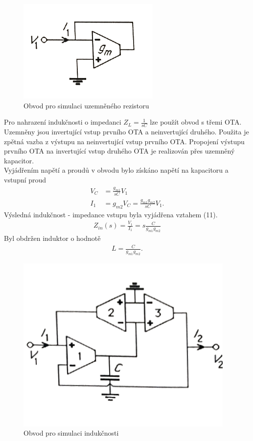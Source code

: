 \documentclass[twoside]{article}
\begin{document}
\begin{figure}[H]
\centering
\includegraphics[scale=0.7]{image10.png}
\caption{Obvod pro simulaci uzemněného rezistoru \cite{8}}
\end{figure}
\noindent Pro nahrazení indukčnosti o impedanci $Z_L = \frac{1}{sC}$ lze použít obvod s třemi OTA. Uzemněny jsou invertující vstup prvního OTA a neinvertující druhého. Použita je zpětná vazba z výstupu na neinvertující vstup prvního OTA. Propojení výstupu prvního OTA na invertující vstup druhého OTA je realizován přes uzemněný kapacitor. \\
Vyjádřením napětí a proudů v obvodu bylo získáno napětí na kapacitoru a vstupní proud
\begin{align}
V_C &= \frac{g_{m1}}{sC}V_1 \\
I_1 &= g_{m2}V_C = \frac{g_{m1}g_{m2}}{sC}V_1.
\end{align}
Výsledná indukčnost - impedance vstupu byla vyjádřena vztahem (11).
\begin{align}
Z_{in}(s) = \frac{V_1}{I_1} = s\frac{C}{g_{m1}g_{m2}}
\end{align}
\noindent Byl obdržen induktor o hodnotě
\begin{align}
L = \frac{C}{g_{m1}g_{m2}}.
\end{align}
\begin{figure}[H]
\centering
\includegraphics[scale=0.55]{image13.png}
\caption{Obvod pro simulaci indukčnosti \cite{8}}
\end{figure}
\end{document}
